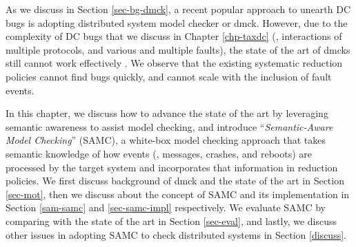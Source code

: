 
As we discuss in Section \ref{sec-bg-dmck}, a recent popular approach to unearth
DC bugs is adopting distributed system model checker or dmck. However, due to the
complexity of DC bugs that we discuss in Chapter \ref{chp-taxdc} (\eg,
interactions of multiple protocols, and various and multiple faults), the state
of the art of dmcks still cannot work effectively \cite{Guo+11-Demeter,
Killian+07-LifeDeathMaceMC, Simsa+10-Dbug, Yang+09-Modist}.  We observe that
the existing systematic reduction policies cannot find bugs quickly, and cannot
scale with the inclusion of fault events.

In this chapter, we discuss how to advance the state of the art by leveraging
semantic awareness to assist model checking, and introduce
``\textit{Semantic-Aware Model Checking}'' (SAMC), a white-box model checking
approach that takes semantic knowledge of how events (\eg, messages, crashes,
and reboots) are processed by the target system and incorporates that
information in reduction policies. We first discuss background of dmck and the
state of the art in Section \ref{sec-mot}, then we discuss about the concept of
SAMC and its implementation in Section \ref{sam-samc} and \ref{sec-samc-impl}
respectively. We evaluate SAMC by comparing with the state of the art in Section
\ref{sec-eval}, and lastly, we discuss other issues in adopting SAMC to check
distributed systems in Section \ref{discuss}.



